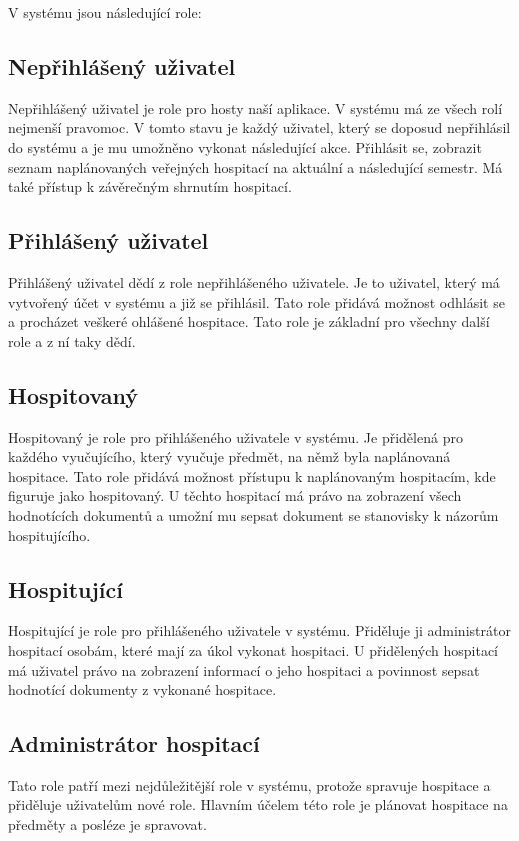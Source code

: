 V systému jsou následující role:

\subsection{Nepřihlášený uživatel}
Nepřihlášený uživatel je role pro hosty naší aplikace. V systému má ze všech rolí nejmenší pravomoc. V tomto stavu je každý uživatel, který se doposud nepřihlásil do systému a je mu umožněno vykonat následující akce. Přihlásit se, zobrazit seznam naplánovaných veřejných hospitací na aktuální a následující semestr. Má také přístup k závěrečným shrnutím hospitací.

\subsection{Přihlášený uživatel}
Přihlášený uživatel dědí z role nepřihlášeného uživatele. Je to uživatel, který má vytvořený účet v systému a již se přihlásil. Tato role přidává možnost odhlásit se a procházet veškeré ohlášené hospitace. Tato role je základní pro všechny další role a z ní taky dědí.

\subsection{Hospitovaný}
Hospitovaný je role pro přihlášeného uživatele v systému. Je přidělená pro každého vyučujícího, který vyučuje předmět, na němž byla naplánovaná hospitace. Tato role přidává možnost přístupu k naplánovaným hospitacím, kde figuruje jako hospitovaný. U těchto hospitací má právo na zobrazení všech hodnotících dokumentů a umožní mu sepsat dokument se stanovisky k názorům hospitujícího.

\subsection{Hospitující}
Hospitující je role pro přihlášeného uživatele v systému. Přiděluje ji administrátor hospitací osobám, které mají za úkol vykonat hospitaci. U přidělených hospitací má uživatel právo na zobrazení informací o jeho hospitaci a povinnost sepsat hodnotící dokumenty z vykonané hospitace.

\subsection{Administrátor hospitací}
Tato role patří mezi nejdůležitější role v systému, protože spravuje hospitace a přiděluje uživatelům nové role. Hlavním účelem této role je plánovat hospitace na předměty a posléze je spravovat.   

